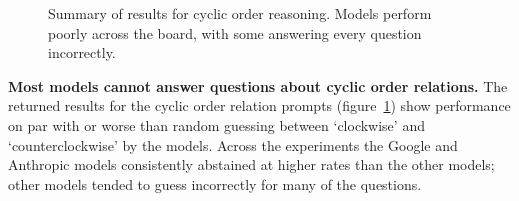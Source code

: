 \begin{figure}
    \centering
    
    \caption{Summary of results for cyclic order reasoning. Models perform poorly across the board, with some answering every question incorrectly.}
    \label{fig:order}
\end{figure}

\textbf{Most models cannot answer questions about cyclic order relations.}
The returned results for the cyclic order relation prompts (figure~\ref{fig:order}) show performance on par with or worse than random guessing between `clockwise' and `counterclockwise' by the models.
Across the experiments the Google and Anthropic models consistently abstained at higher rates than the other models; other models tended to guess incorrectly for many of the questions.
